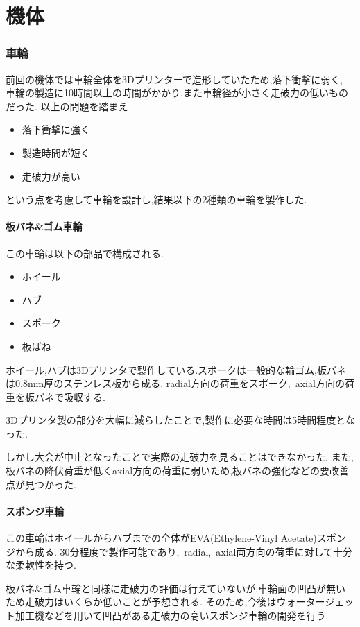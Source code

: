\part*{機体}
\section{車輪}
前回の機体では車輪全体を3Dプリンターで造形していたため,落下衝撃に弱く,
車輪の製造に10時間以上の時間がかかり,また車輪径が小さく走破力の低いものだった.
以上の問題を踏まえ
\begin{itemize}
  \item 落下衝撃に強く
  \item 製造時間が短く
  \item 走破力が高い
\end{itemize}
という点を考慮して車輪を設計し,結果以下の2種類の車輪を製作した.
\subsection{板バネ\&ゴム車輪}
この車輪は以下の部品で構成される.
\begin{itemize}
  \item ホイール
  \item ハブ
  \item スポーク
  \item 板ばね
\end{itemize}
ホイール,ハブは3Dプリンタで製作している.スポークは一般的な輪ゴム,板バネは0.8mm厚のステンレス板から成る.
radial方向の荷重をスポーク,\ axial方向の荷重を板バネで吸収する.

3Dプリンタ製の部分を大幅に減らしたことで,製作に必要な時間は5時間程度となった.

しかし大会が中止となったことで実際の走破力を見ることはできなかった.
また,板バネの降伏荷重が低くaxial方向の荷重に弱いため,板バネの強化などの要改善点が見つかった.
\vfill\null
\columnbreak
{}
\subsection{スポンジ車輪}
この車輪はホイールからハブまでの全体がEVA(Ethylene-Vinyl Acetate)スポンジから成る.
30分程度で製作可能であり,\ radial,\ axial両方向の荷重に対して十分な柔軟性を持つ.

板バネ\&ゴム車輪と同様に走破力の評価は行えていないが,車輪面の凹凸が無いため走破力はいくらか低いことが予想される.
そのため,今後はウォータージェット加工機などを用いて凹凸がある走破力の高いスポンジ車輪の開発を行う.
\vfill\null
\columnbreak
